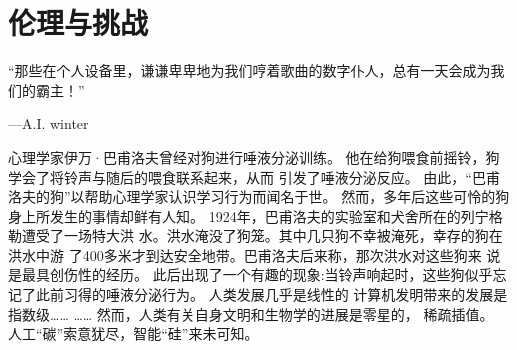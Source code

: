\chapter{伦理与挑战}
“那些在个人设备里，谦谦卑卑地为我们哼着歌曲的数字仆人，总有一天会成为我们的霸主！”
\begin{flushright}
---A.I. winter
\end{flushright}
心理学家伊万·巴甫洛夫曾经对狗进行唾液分泌训练。
他在给狗喂食前摇铃，狗学会了将铃声与随后的喂食联系起来，从而
引发了唾液分泌反应。
由此，“巴甫洛夫的狗”以帮助心理学家认识学习行为而闻名于世。
然而，多年后这些可怜的狗身上所发生的事情却鲜有人知。
1924年，巴甫洛夫的实验室和犬舍所在的列宁格勒遭受了一场特大洪 水。洪水淹没了狗笼。其中几只狗不幸被淹死，幸存的狗在洪水中游 了400多米才到达安全地带。巴甫洛夫后来称，那次洪水对这些狗来 说是最具创伤性的经历。
此后出现了一个有趣的现象:当铃声响起时，这些狗似乎忘记了此前习得的唾液分泌行为。
人类发展几乎是线性的
计算机发明带来的发展是指数级……
……
然而，人类有关自身文明和生物学的进展是零星的， 稀疏插值。
人工“碳”索意犹尽，智能“硅”来未可知。
